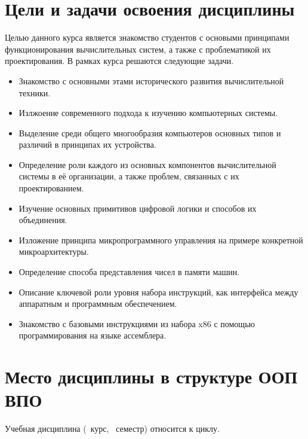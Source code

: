






\section{Цели и задачи освоения дисциплины}

Целью данного курса является знакомство студентов с основыми принципами функционирования вычислительных систем, а также с проблематикой их проектирования. В рамках курса решаются следующие задачи.
\begin{itemize}
	\item Знакомство с основными этами исторического развития вычислительной техники.
	\item Излжоение современного подхода к изучению компьютерных системы.
	\item Выделение среди общего многообразия компьютеров основных типов и различий в принципах их устройства.
	\item Определение роли каждого из основных компонентов вычислительной системы в её организации, а также проблем, связанных с их проектированием.
	\item Изучение основных примитивов цифровой логики и способов их объединения.
	\item Изложение принципа микропрограммного управления на примере конкретной микроархитектуры.
	\item Определение способа представления чисел в памяти машин.
	\item Описание ключевой роли уровня набора инструкций, как интерфейса между аппаратным и программным обеспечением.
	\item Знакомство с базовыми инструкциями из набора x86 с помощью программирования на языке ассемблера.
\end{itemize}

\section{Место дисциплины в структуре ООП ВПО}


	\ssect Учебная дисциплина \thecourse{}
(\theyearofstudy~курс, \theterm~семестр) относится к  циклу.

